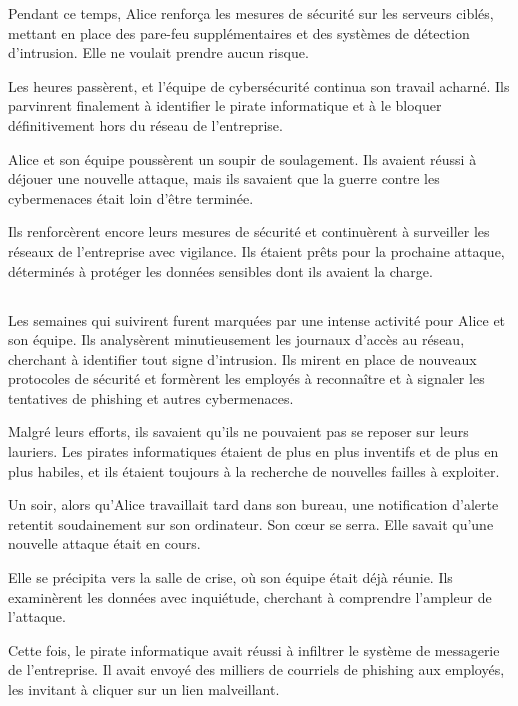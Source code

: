 \documentclass{./StyCls/MyArticle}
\begin{document}
Pendant ce temps, Alice renforça les mesures de sécurité sur les serveurs ciblés, mettant en place des pare-feu supplémentaires et des systèmes de détection d'intrusion. Elle ne voulait prendre aucun risque.

Les heures passèrent, et l'équipe de cybersécurité continua son travail acharné. Ils parvinrent finalement à identifier le pirate informatique et à le bloquer définitivement hors du réseau de l'entreprise.

Alice et son équipe poussèrent un soupir de soulagement. Ils avaient réussi à déjouer une nouvelle attaque, mais ils savaient que la guerre contre les cybermenaces était loin d'être terminée.

Ils renforcèrent encore leurs mesures de sécurité et continuèrent à surveiller les réseaux de l'entreprise avec vigilance. Ils étaient prêts pour la prochaine attaque, déterminés à protéger les données sensibles dont ils avaient la charge.

\subsection{}


Les semaines qui suivirent furent marquées par une intense activité pour Alice et son équipe. Ils analysèrent minutieusement les journaux d'accès au réseau, cherchant à identifier tout signe d'intrusion. Ils mirent en place de nouveaux protocoles de sécurité et formèrent les employés à reconnaître et à signaler les tentatives de phishing et autres cybermenaces.

Malgré leurs efforts, ils savaient qu'ils ne pouvaient pas se reposer sur leurs lauriers. Les pirates informatiques étaient de plus en plus inventifs et de plus en plus habiles, et ils étaient toujours à la recherche de nouvelles failles à exploiter.

Un soir, alors qu'Alice travaillait tard dans son bureau, une notification d'alerte retentit soudainement sur son ordinateur. Son cœur se serra. Elle savait qu'une nouvelle attaque était en cours.

Elle se précipita vers la salle de crise, où son équipe était déjà réunie. Ils examinèrent les données avec inquiétude, cherchant à comprendre l'ampleur de l'attaque.

Cette fois, le pirate informatique avait réussi à infiltrer le système de messagerie de l'entreprise. Il avait envoyé des milliers de courriels de phishing aux employés, les invitant à cliquer sur un lien malveillant.
\end{document}
